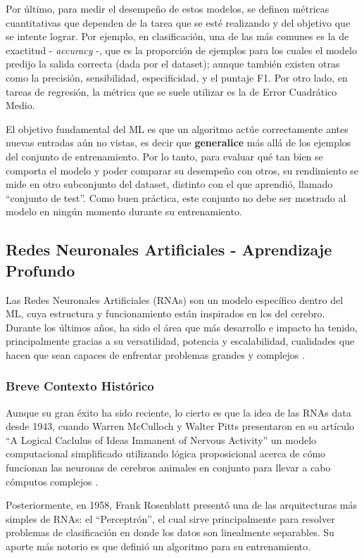 \documentclass[../../main.tex]{subfiles}
\begin{document}
Por último, para medir el desempeño de estos modelos, se definen métricas cuantitativas que dependen de la tarea que se esté realizando y del objetivo que se intente lograr. Por ejemplo, en clasificación, una de las más comunes es la de exactitud - \textit{accuracy} -, que es la proporción de ejemplos para los cuales el modelo predijo la salida correcta (dada por el dataset); aunque también existen otras como la precisión, sensibilidad, especificidad, y el puntaje F1. Por otro lado, en tareas de regresión, la métrica que se suele utilizar es la de Error Cuadrático Medio. 

El objetivo fundamental del ML es que un algoritmo actúe correctamente antes nuevas entradas aún no vistas, es decir que \textbf{generalice} más allá de los ejemplos del conjunto de entrenamiento. Por lo tanto, para evaluar qué tan bien se comporta el modelo y poder comparar su desempeño con otros, su rendimiento se mide en otro subconjunto del dataset, distinto con el que aprendió, llamado ``conjunto de test''. Como buen práctica, este conjunto no debe ser mostrado al modelo en ningún momento durante su entrenamiento.

\subsection{Redes Neuronales Artificiales - Aprendizaje Profundo}
Las Redes Neuronales Artificiales (RNAs) son un modelo específico dentro del ML, cuya estructura y funcionamiento están inspirados en los del cerebro. Durante los últimos años, ha sido el área que más desarrollo e impacto ha tenido, principalmente gracias a su versatilidad, potencia y escalabilidad, cualidades que hacen que sean capaces de enfrentar problemas grandes y complejos \cite{hands-on-ML-sklearn-tf}.

\subsubsection{Breve Contexto Histórico}
Aunque su gran éxito ha sido reciente, lo cierto es que la idea de las RNAs data desde 1943, cuando Warren McCulloch y Walter Pitts presentaron en su artículo ``A Logical Caclulus of Ideas Immanent of Nervous Activity'' un modelo computacional simplificado utilizando lógica proposicional acerca de cómo funcionan las neuronas de cerebros animales en conjunto para llevar a cabo cómputos complejos \cite{hands-on-ML-sklearn-tf}. 

Posteriormente, en 1958, Frank Rosenblatt \cite{rosenblatt1958perceptron} presentó una de las arquitecturas más simples de RNAs: el ``Perceptrón'', el cual sirve principalmente para resolver problemas de clasificación en donde los datos son linealmente separables. Su aporte más notorio es que definió un algoritmo para su entrenamiento.
\end{document}

